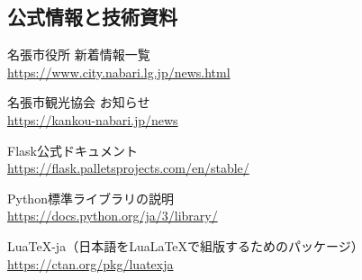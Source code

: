 \documentclass[a4paper,10pt]{ltjsarticle}
\begin{document}
\subsection*{公式情報と技術資料}

名張市役所 新着情報一覧\\
\url{https://www.city.nabari.lg.jp/news.html}


名張市観光協会 お知らせ\\
\url{https://kankou-nabari.jp/news}


Flask公式ドキュメント\\
\url{https://flask.palletsprojects.com/en/stable/}


Python標準ライブラリの説明\\
\url{https://docs.python.org/ja/3/library/}


LuaTeX-ja（日本語をLuaLaTeXで組版するためのパッケージ）\\
\url{https://ctan.org/pkg/luatexja}
\end{document}

